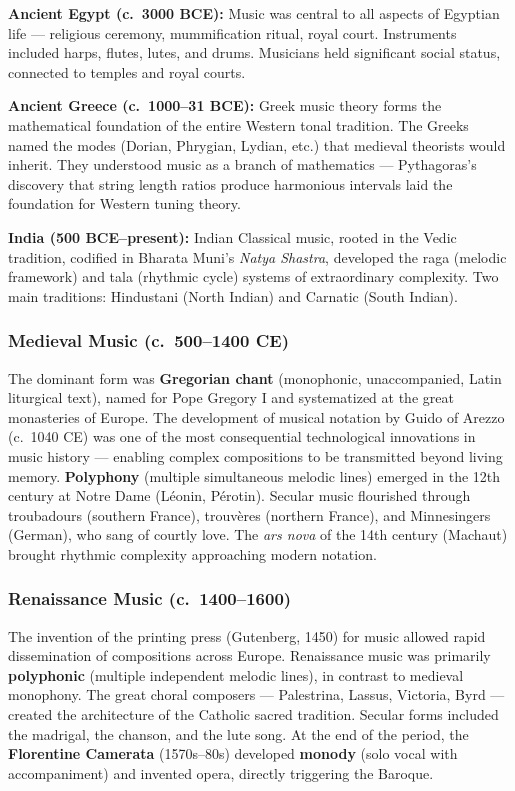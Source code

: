 \documentclass[11pt,letterpaper]{article}
\begin{document}
\textbf{Ancient Egypt (c.~3000 BCE):} Music was central to all aspects of Egyptian life --- religious ceremony, mummification ritual, royal court. Instruments included harps, flutes, lutes, and drums. Musicians held significant social status, connected to temples and royal courts.

\textbf{Ancient Greece (c.~1000--31 BCE):} Greek music theory forms the mathematical foundation of the entire Western tonal tradition. The Greeks named the modes (Dorian, Phrygian, Lydian, etc.) that medieval theorists would inherit. They understood music as a branch of mathematics --- Pythagoras's discovery that string length ratios produce harmonious intervals laid the foundation for Western tuning theory.

\textbf{India (500 BCE--present):} Indian Classical music, rooted in the Vedic tradition, codified in Bharata Muni's \emph{Natya Shastra}, developed the raga (melodic framework) and tala (rhythmic cycle) systems of extraordinary complexity. Two main traditions: Hindustani (North Indian) and Carnatic (South Indian).

\subsubsection{Medieval Music (c.~500--1400 CE)}

The dominant form was \textbf{Gregorian chant} (monophonic, unaccompanied, Latin liturgical text), named for Pope Gregory I and systematized at the great monasteries of Europe. The development of musical notation by Guido of Arezzo (c.~1040 CE) was one of the most consequential technological innovations in music history --- enabling complex compositions to be transmitted beyond living memory. \textbf{Polyphony} (multiple simultaneous melodic lines) emerged in the 12th century at Notre Dame (Léonin, Pérotin). Secular music flourished through troubadours (southern France), trouvères (northern France), and Minnesingers (German), who sang of courtly love. The \emph{ars nova} of the 14th century (Machaut) brought rhythmic complexity approaching modern notation.

\subsubsection{Renaissance Music (c.~1400--1600)}

The invention of the printing press (Gutenberg, 1450) for music allowed rapid dissemination of compositions across Europe. Renaissance music was primarily \textbf{polyphonic} (multiple independent melodic lines), in contrast to medieval monophony. The great choral composers --- Palestrina, Lassus, Victoria, Byrd --- created the architecture of the Catholic sacred tradition. Secular forms included the madrigal, the chanson, and the lute song. At the end of the period, the \textbf{Florentine Camerata} (1570s--80s) developed \textbf{monody} (solo vocal with accompaniment) and invented opera, directly triggering the Baroque.
\end{document}
